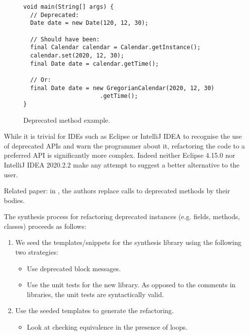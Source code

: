 \documentclass[runningheads,a4paper]{llncs}
\begin{document}
\begin{figure}
\begin{lstlisting}[mathescape=true,showstringspaces=false]
void main(String[] args) {
  // Deprecated:
  Date date = new Date(120, 12, 30);

  // Should have been:
  final Calendar calendar = Calendar.getInstance();
  calendar.set(2020, 12, 30);
  final Date date = calendar.getTime();

  // Or:
  final Date date = new GregorianCalendar(2020, 12, 30)
                      .getTime();
}
\end{lstlisting}
\caption{Deprecated method example.}
\label{ex:deprecated-method}
\end{figure}

While it is trivial for IDEs such as Eclipse or IntelliJ IDEA to recognise the
use of deprecated APIs and warn the programmer about it, refactoring the code to
a preferred API is significantly more complex. Indeed neither Eclipse 4.15.0 nor
IntelliJ IDEA 2020.2.2 make any attempt to suggest a better alternative to the
user.


Related paper: in \cite{DBLP:conf/paste/Perkins05}, the authors
replace calls to deprecated methods by their bodies.


The synthesis process for refactoring deprecated instances (e.g. fields, methods, classes) proceeds as follows:
\begin{enumerate}
\item We seed the templates/snippets for the synthesis library using the following two strategies:
  \begin{itemize}
\item Use deprecated block messages.
\item Use the unit tests for the new library. As opposed to the comments in libraries,
  the unit tests are syntactically valid.
  \end{itemize}

\item Use the seeded templates to generate the refactoring.
  \begin{itemize}
\item Look at checking equivalence in the presence of loops.
  \end{itemize}
  \end{enumerate}
\end{document}
